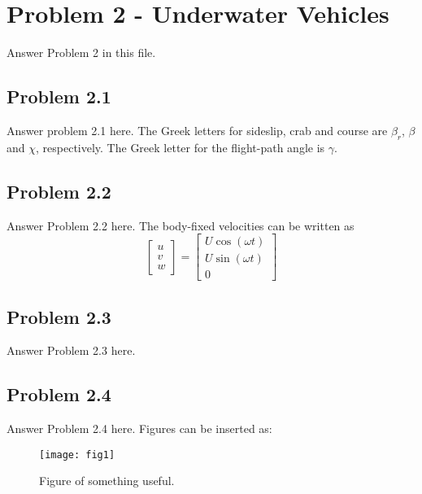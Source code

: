 \section*{Problem 2 - Underwater Vehicles}
Answer Problem 2 in this file. 
\subsection*{Problem 2.1}
Answer problem 2.1 here. The Greek letters for sideslip, crab and course are $\beta_r$, $\beta$ and $\chi$, respectively. The Greek letter for the flight-path angle is $\gamma$.

\subsection*{Problem 2.2}
Answer Problem 2.2 here. The body-fixed velocities can be written as
\begin{equation}
\label{eq:velocity}
	\begin{bmatrix}
		u \\
		v \\
		w
	\end{bmatrix}
	= 
	\begin{bmatrix}
		U \cos( \omega t)\\
		U \sin(\omega t)\\
		0	
	\end{bmatrix}
\end{equation}

\subsection*{Problem 2.3}
Answer Problem 2.3 here.

\subsection*{Problem 2.4}
Answer Problem 2.4 here. Figures can be inserted as:
\begin{figure}[ht]
	\centering
	\texttt{[image: fig1]} %
	\caption{Figure of something useful.}
	\label{fig:fig1}
\end{figure}

